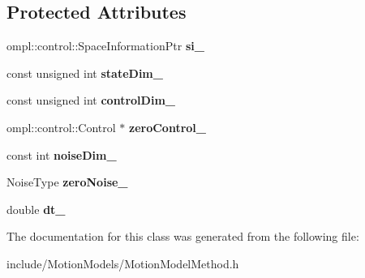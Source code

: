 \subsection*{\-Protected \-Attributes}
\begin{DoxyCompactItemize}
\item 
\hypertarget{class_motion_model_method_a7410df94d1231268c431dd73f2e5338d}{ompl\-::control\-::\-Space\-Information\-Ptr {\bfseries si\-\_\-}}\label{class_motion_model_method_a7410df94d1231268c431dd73f2e5338d}

\item 
\hypertarget{class_motion_model_method_a6d76506c342c3bf089eb548c531e2105}{const unsigned int {\bfseries state\-Dim\-\_\-}}\label{class_motion_model_method_a6d76506c342c3bf089eb548c531e2105}

\item 
\hypertarget{class_motion_model_method_ab9b45acbafce1f4c873ee7095bc49964}{const unsigned int {\bfseries control\-Dim\-\_\-}}\label{class_motion_model_method_ab9b45acbafce1f4c873ee7095bc49964}

\item 
\hypertarget{class_motion_model_method_ae5e55aa39c0d819c3e9afffefa3d5b08}{ompl\-::control\-::\-Control $\ast$ {\bfseries zero\-Control\-\_\-}}\label{class_motion_model_method_ae5e55aa39c0d819c3e9afffefa3d5b08}

\item 
\hypertarget{class_motion_model_method_a47725ad490fdc510cdc38838165b27c6}{const int {\bfseries noise\-Dim\-\_\-}}\label{class_motion_model_method_a47725ad490fdc510cdc38838165b27c6}

\item 
\hypertarget{class_motion_model_method_ac5b0a8829ec75b20d78deff84f71cbb5}{\-Noise\-Type {\bfseries zero\-Noise\-\_\-}}\label{class_motion_model_method_ac5b0a8829ec75b20d78deff84f71cbb5}

\item 
\hypertarget{class_motion_model_method_a482972cd2ec0bec4b42137811e1d0446}{double {\bfseries dt\-\_\-}}\label{class_motion_model_method_a482972cd2ec0bec4b42137811e1d0446}

\end{DoxyCompactItemize}


\-The documentation for this class was generated from the following file\-:\begin{DoxyCompactItemize}
\item 
include/\-Motion\-Models/\-Motion\-Model\-Method.\-h\end{DoxyCompactItemize}
